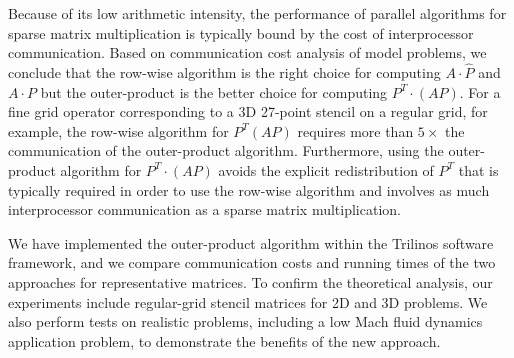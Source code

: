 \documentclass{report}
\begin{document}
Because of its low arithmetic intensity, the performance of parallel
algorithms for sparse matrix multiplication is typically bound by the
cost of interprocessor communication.
Based on communication cost analysis of model problems, we conclude that
the row-wise algorithm is the right choice for computing $A\cdot
\widehat{P}$ and $A\cdot P$ but the outer-product is the better choice
for computing $P^T\cdot (AP)$.
For a fine grid operator corresponding to a 3D 27-point stencil on a
regular grid, for example, the row-wise algorithm for $P^T(AP)$ requires
more than $5\times$ the communication of the outer-product algorithm.
Furthermore, using the outer-product algorithm for $P^T\cdot(AP)$ avoids
the explicit redistribution of $P^T$ that is typically required in order
to use the row-wise algorithm and involves as much interprocessor
communication as a sparse matrix multiplication.

We have implemented the outer-product algorithm within the Trilinos
software framework, and we compare communication costs and running times
of the two approaches for representative matrices.
To confirm the theoretical analysis, our experiments include regular-grid
stencil matrices for 2D and 3D problems.
We also perform tests on realistic problems, including a low Mach fluid
dynamics application problem, to demonstrate the benefits of the new
approach.
\end{document}
